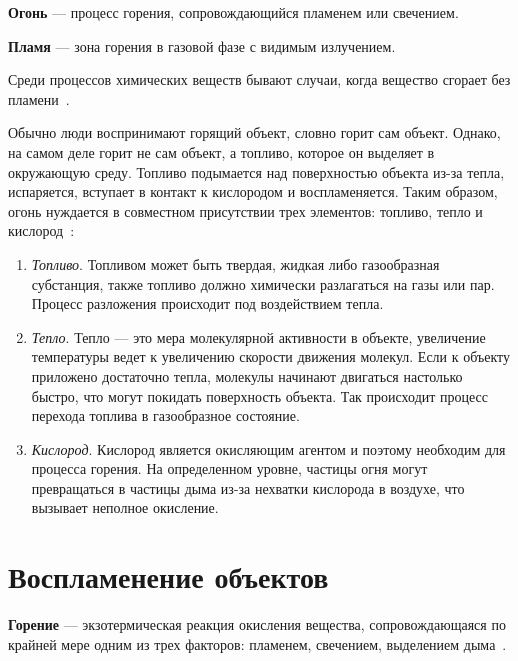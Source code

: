 \textbf{Огонь} --- процесс горения, сопровождающийся пламенем или свечением.

\textbf{Пламя} --- зона горения в газовой фазе с видимым излучением.

Среди процессов химических веществ бывают случаи, когда вещество сгорает без
пламени~\cite{WikiFire}.

Обычно люди воспринимают горящий объект, словно горит сам объект. Однако, на
самом деле горит не сам объект, а топливо, которое он выделяет в окружающую
среду. Топливо подымается над поверхностью объекта из-за тепла, испаряется,
вступает в контакт к кислородом и воспламеняется. Таким образом, огонь нуждается
в совместном присутствии трех элементов: топливо, тепло и
кислород~\cite{USArmy}:
\begin{enumerate}
    \item \emph{Топливо}. Топливом может быть твердая, жидкая либо газообразная
        субстанция, также топливо должно химически разлагаться на газы или
        пар. Процесс разложения происходит под воздействием тепла.
    \item \emph{Тепло}. Тепло --- это мера молекулярной активности в объекте,
        увеличение температуры ведет к увеличению скорости движения молекул.
        Если к объекту приложено достаточно тепла, молекулы начинают двигаться
        настолько быстро, что могут покидать поверхность объекта. Так происходит
        процесс перехода топлива в газообразное состояние.
    \item \emph{Кислород}. Кислород является окисляющим агентом и поэтому
        необходим для процесса горения. На определенном уровне, частицы огня
        могут превращаться в частицы дыма из-за нехватки кислорода в воздухе,
        что вызывает неполное окисление.
\end{enumerate}

\section{Воспламенение объектов}

\textbf{Горение} --- экзотермическая реакция окисления вещества,
сопровождающаяся по крайней мере одним из трех факторов: пламенем, свечением,
выделением дыма~\cite{383-87}.

